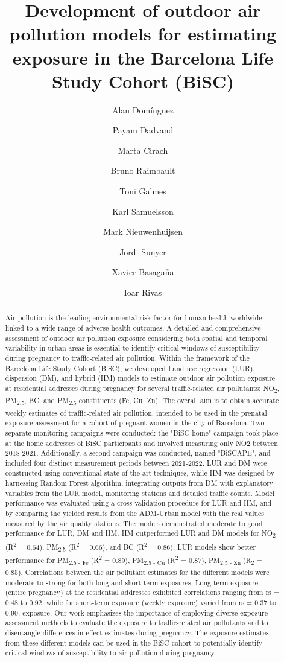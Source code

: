 \documentclass{article}
\title{\textbf{Development of outdoor air pollution models for estimating exposure in the Barcelona Life Study Cohort (BiSC)}}
\author[1, 2, 3]{Alan Domínguez}
\author[1, 3, 4]{Payam Dadvand}
\author[1]{Marta Cirach}
\author[1]{Bruno Raimbault}
\author[1]{Toni Galmes}
\author[1]{Karl Samuelsson}
\author[1, 2, 3]{Mark Nieuwenhuijsen}
\author[1, 2, 3]{Jordi Sunyer}
\author[1, 2, 3]{Xavier Basagaña}
\author[1, 2, 3]{Ioar Rivas}
\affil[1]{Barcelona Institute for Global Health (ISGlobal), Barcelona, Spain.}
\affil[2]{Universitat Pompeu Fabra (UPF), Barcelona, Spain.}
\affil[3]{CIBER Epidemiología y Salud Pública (CIBERESP), Madrid, Spain.}
\affil[4]{London School of Hygiene and Tropical Medicine (LSHTM), London, UK.}
\begin{document}
\maketitle

\begin{abstract}

Air pollution is the leading environmental risk factor for human health worldwide linked to a wide range of adverse health outcomes. A detailed and comprehensive assessment of outdoor air pollution exposure considering both spatial and temporal variability in urban areas is essential to identify critical windows of susceptibility during pregnancy to traffic-related air pollution. Within the framework of the Barcelona Life Study Cohort (BiSC), we developed Land use regression (LUR), dispersion (DM), and hybrid (HM) models to estimate outdoor air pollution exposure at residential addresses during pregnancy for several traffic-related air pollutants; NO\textsubscript{2}, PM\textsubscript{2.5}, BC, and PM\textsubscript{2.5} constituents (Fe, Cu, Zn). The overall aim is to obtain accurate weekly estimates of traffic-related air pollution, intended to be used in the prenatal exposure assessment for a cohort of pregnant women in the city of Barcelona. Two separate monitoring campaigns were conducted: the "BiSC-home" campaign took place at the home addresses of BiSC participants and involved measuring only NO2 between 2018-2021. Additionally, a second campaign was conducted, named "BiSCAPE", and included four distinct measurement periods between 2021-2022. LUR and DM were constructed using conventional state-of-the-art techniques, while HM was designed by harnessing Random Forest algorithm, integrating outputs from DM with explanatory variables from the LUR model, monitoring stations and detailed traffic counts. Model performance was evaluated using a cross-validation procedure for LUR and HM, and by comparing the yielded results from the ADM-Urban model with the real values measured by the air quality stations. The models demonstrated moderate to good performance for LUR, DM and HM. HM outperformed LUR and DM models for NO\textsubscript{2} (R\textsuperscript{2} = 0.64), PM\textsubscript{2.5} (R\textsuperscript{2} = 0.66), and BC (R\textsuperscript{2} = 0.86). LUR models show better performance for PM\textsubscript{2.5 - Fe} (R\textsuperscript{2} = 0.89), PM\textsubscript{2.5 - Cu} (R\textsuperscript{2} = 0.87), PM\textsubscript{2.5 - Zn} (R\textsubscript{2} = 0.85). Correlations between the air pollutant estimates for the different models were moderate to strong for both long-and-short term exposures. Long-term exposure (entire pregnancy) at the residential addresses exhibited correlations ranging from rs = 0.48 to 0.92, while for short-term exposure (weekly exposure) varied from rs = 0.37 to 0.90. exposure. Our work emphasizes the importance of employing diverse exposure assessment methods to evaluate the exposure to traffic-related air pollutants and to disentangle differences in effect estimates during pregnancy. The exposure estimates from these different models can be used in the BiSC cohort to potentially identify critical windows of susceptibility to air pollution during pregnancy. 


\end{abstract}
\end{document}
